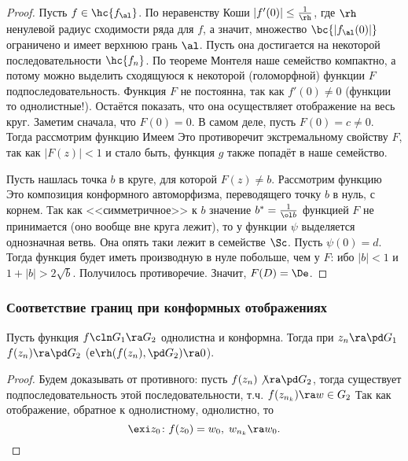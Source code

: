 \documentclass[a4paper]{article}
\begin{document}
\begin{theorem}
\begin{proof}
Пусть $f \in \hc{f_\al}$. По неравенству Коши $|f'(0)| \le \frac{1}{\rh}$, где $\rh$ ненулевой радиус
сходимости ряда для $f$, а значит, множество $\bc{|f_\al(0)|}$ ограничено и имеет верхнюю грань $\al$.
Пусть она достигается на некоторой последовательности $\hc{f_n}$. По теореме Монтеля наше семейство компактно,
а потому можно выделить сходящуюся к некоторой (голоморфной) функции $F$ подпоследовательность. Функция $F$ не постоянна,
так как $f'(0)\neq 0$ (функции то однолистные!). Остаётся показать, что она осуществляет отображение на весь круг.
Заметим сначала, что $F(0)=0$. В самом деле, пусть $F(0)=c\neq 0$. Тогда рассмотрим функцию
Имеем
Это противоречит экстремальному свойству $F$, так как $|F(z)|< 1$ и стало быть, функция $g$ также попадёт
в наше семейство.

Пусть нашлась точка $b$ в круге, для которой $F(z)\neq b$. Рассмотрим функцию
Это композиция конформного автоморфизма, переводящего точку $b$ в нуль, с корнем. Так как <<симметричное>> к $b$
значение $b^* = \frac{1}{\ol b}$ функцией $F$ не принимается (оно вообще вне круга лежит), то у функции $\psi$
выделяется однозначная ветвь. Она опять таки лежит в семействе $\Sc$. Пусть $\psi(0) = d$. Тогда
функция
будет иметь производную в нуле побольше, чем у $F$:
ибо $|b|<1$ и $1+|b|>2\sqrt b$. Получилось противоречие. Значит, $F(D) = \De$.
\end{proof}

\subsubsection{Соответствие границ при конформных отображениях}

\begin{theorem}
Пусть функция $f\cln G_1 \ra G_2$ однолистна и конформна. Тогда при
$z_n \ra \pd G_1$  $f(z_n)\ra \pd G_2$ (е$\rh (f(z_n), \pd G_2)\ra 0$).
\end{theorem}

\begin{proof}
Будем доказывать от противного: пусть $f(z_n)\not\ra \pd G_2$, тогда существует
подпоследовательность этой последовательности, т.ч. $f(z_{n_k})\ra w\in G_2$
Так как отображение, обратное к однолистному, однолистно,  то
$$\exi z_0\colon f(z_0)=w_0,  \; w_{n_k}\ra w_0.$$


\end{proof}
\end{theorem}
\end{document}
